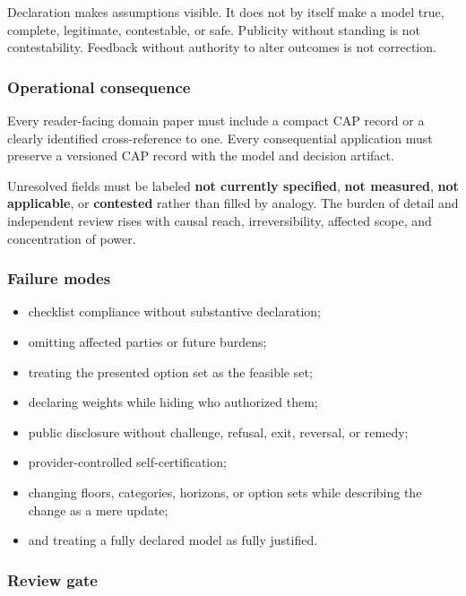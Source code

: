 \documentclass[
  11pt,
]{article}
\providecommand{\tightlist}{%
  \setlength{\itemsep}{0pt}\setlength{\parskip}{0pt}}
\begin{document}
Declaration makes assumptions visible. It does not by itself make a
model true, complete, legitimate, contestable, or safe. Publicity
without standing is not contestability. Feedback without authority to
alter outcomes is not correction.

\subsubsection{Operational
consequence}\label{operational-consequence-19}

Every reader-facing domain paper must include a compact CAP record or a
clearly identified cross-reference to one. Every consequential
application must preserve a versioned CAP record with the model and
decision artifact.

Unresolved fields must be labeled \textbf{not currently specified},
\textbf{not measured}, \textbf{not applicable}, or \textbf{contested}
rather than filled by analogy. The burden of detail and independent
review rises with causal reach, irreversibility, affected scope, and
concentration of power.

\subsubsection{Failure modes}\label{failure-modes-10}

\begin{itemize}
\tightlist
\item
  checklist compliance without substantive declaration;
\item
  omitting affected parties or future burdens;
\item
  treating the presented option set as the feasible set;
\item
  declaring weights while hiding who authorized them;
\item
  public disclosure without challenge, refusal, exit, reversal, or
  remedy;
\item
  provider-controlled self-certification;
\item
  changing floors, categories, horizons, or option sets while describing
  the change as a mere update;
\item
  and treating a fully declared model as fully justified.
\end{itemize}

\subsubsection{Review gate}\label{review-gate-2}
\end{document}
